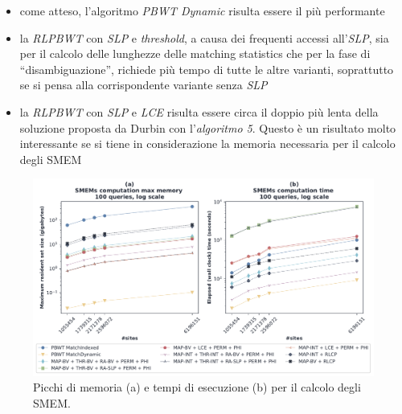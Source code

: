 \begin{itemize}
  \item come atteso, l'algoritmo \textit{PBWT Dynamic} risulta essere il più
  performante
  \item la \textit{RLPBWT} con \textit{SLP} e \textit{threshold}, a causa dei
  frequenti accessi all'\textit{SLP}, sia per il calcolo delle lunghezze delle
  matching statistics che per la fase di ``disambiguazione'', richiede più tempo
  di tutte le altre varianti, soprattutto se si pensa alla corrispondente
  variante senza \textit{SLP}
  \item  la \textit{RLPBWT} con \textit{SLP} e \textit{LCE} risulta essere circa
  il doppio più lenta della soluzione proposta da Durbin con l'\textit{algoritmo
    5}. Questo è un risultato 
  molto interessante se si tiene in considerazione la memoria necessaria per il
  calcolo degli SMEM
\end{itemize}
\begin{figure}
  \centering
  \includegraphics[width=\linewidth]{img/exe_time_mem_paper}
  \caption{Picchi di memoria (a) e tempi di esecuzione (b) per il calcolo degli
    SMEM.}
  \label{fig:smemtimememchr}
\end{figure}
